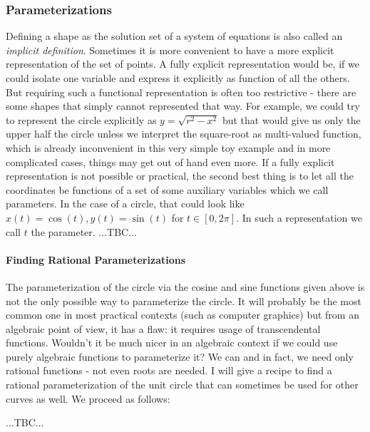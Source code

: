 \subsubsection{Parameterizations}
Defining a shape as the solution set of a system of equations is also called an \emph{implicit definition}. Sometimes it is more convenient to have a more explicit representation of the set of points. A fully explicit representation would be, if we could isolate one variable and express it explicitly as function of all the others. But requiring such a functional representation is often too restrictive - there are some shapes that simply cannot represented that way. For example, we could try to represent the circle explicitly as $y = \sqrt{r^2 - x^2}$ but that would give us only the upper half the circle unless we interpret the square-root as multi-valued function, which is already inconvenient in this very simple toy example and in more complicated cases, things may get out of hand even more. If a fully explicit representation is not possible or practical, the second best thing is to let all the coordinates be functions of a set of some auxiliary variables which we call parameters. In the case of a circle, that could look like $x(t) = \cos(t), y(t) = \sin(t)$ for $t \in [0, 2 \pi]$. In such a representation we call $t$ the parameter.
...TBC...

\paragraph{Finding Rational Parameterizations}
The parameterization of the circle via the cosine and sine functions given above is not the only possible way to parameterize the circle. It will probably be the most common one in most practical contexts (such as computer graphics) but from an algebraic point of view, it has a flaw: it requires usage of transcendental functions. Wouldn't it be much nicer in an algebraic context if we could use purely algebraic functions to parameterize it? We can and in fact, we need only rational functions - not even roots are needed. I will give a recipe to find a rational parameterization of the unit circle that can sometimes be used for other curves as well. We proceed as follows:


...TBC...

